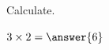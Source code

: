 \documentclass{ximera}
\begin{document}

















                                                                   



                                       




                                    














\maketitle    
  Calculate.
\begin{question}  
$3\times 2 = \answer{6}$  
\end{question} 
\end{document}

